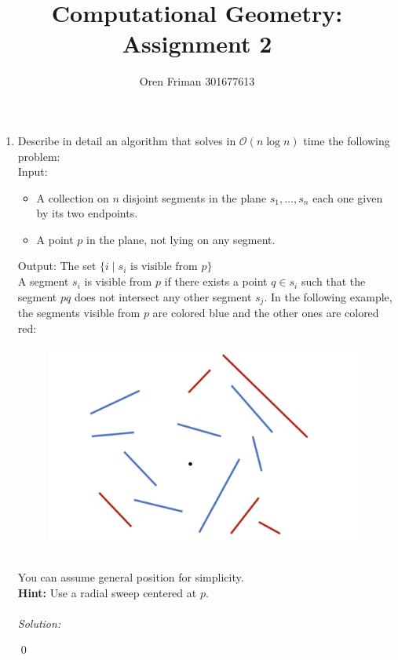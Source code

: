 \documentclass[a4paper, 8pt, oneside]{article}
\newenvironment{sol}
    {\emph{Solution:}
    }
    {
    \qed
    }
\begin{document}
\title{Computational Geometry: Assignment 2}
\author{Oren Friman 301677613}
\maketitle

\medskip

\begin{enumerate}
\item \label{item:q1} Describe in detail an algorithm that solves in  $\mathcal{O}(n\log{}n)$ time the following problem: \\
Input:
 \begin{itemize}
  \item A collection on $n$ disjoint segments in the plane $s_1, \ldots, s_n$ each one given by its two endpoints.
  \item A point $p$ in the plane, not lying on any segment.
\end{itemize}
Output: The set $\{ i \mid s_i \text{ is visible from } p\}$ \\
A segment $s_i$ is visible from $p$ if there exists a point $q \in s_i$ such that the segment $pq$ does not intersect  any other segment $s_j$. In the following example, the segments visible from $p$ are colored blue and the other ones are colored red:
\begin{figure}[h]
\includegraphics[scale=0.5]{example1}
\centering
\end{figure} \\
You can assume general position for simplicity. \\
\textbf{Hint:} Use a radial sweep centered at $p$. \\ \\
\begin{sol}


\end{sol}
\end{enumerate}
\end{document}
